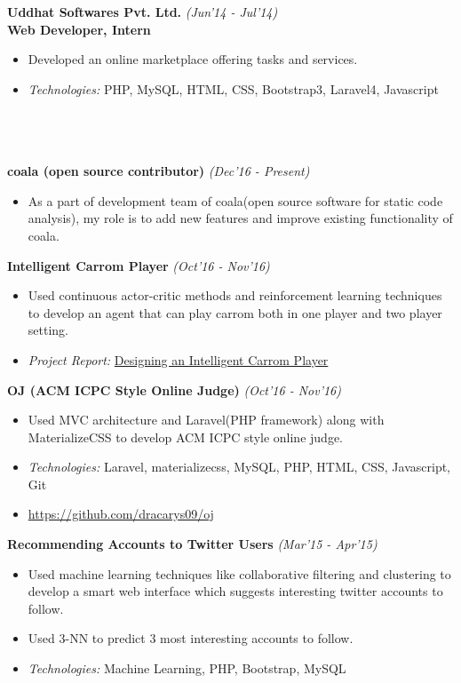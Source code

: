 \documentclass[a4paper,10pt]{article}
\newcommand{\lsep}{-0.5cm}
\newcommand{\resheading}[1]{{\small \colorbox{mygrey}{\begin{minipage}{0.975\textwidth}{\textbf{#1 \vphantom{p\^{E}}}}\end{minipage} \hspace{0.2cm}}}}
\begin{document}
\indent \small{\textbf{Uddhat Softwares Pvt. Ltd.}}	\hfill	\small{\textit{(Jun'14 - Jul'14)}} \\
\indent \small{\textbf{Web Developer, Intern}}
\begin{itemize}
\item \noindent \small{Developed an online marketplace offering tasks and services.}
\\[-0.5cm]
\item \noindent \small{\textit{Technologies:} PHP, MySQL, HTML, CSS, Bootstrap3, Laravel4, Javascript}
\end{itemize}

\indent \resheading{\textbf{PROJECTS}}\\[\lsep]
\\ \\
\indent\small{\textbf{coala (open source contributor)}}	\hfill	\small{\textit{(Dec'16 - Present)}}
\begin{itemize}
 \item As a part of development team of coala(open source software for static code analysis), my role is to add new features and improve existing functionality of coala.
\end{itemize}

\indent\small{\textbf{Intelligent Carrom Player}}	\hfill	\small{\textit{(Oct'16 - Nov'16)}}
\begin{itemize}
 \item Used continuous actor-critic methods and reinforcement learning techniques to develop an agent that can play carrom both in one player and two player setting.
 \item \textit{Project Report: } \href{https://goo.gl/2Csvi8}{Designing an Intelligent Carrom Player}
\end{itemize}

\indent\small{\textbf{OJ (ACM ICPC Style Online Judge)}}	\hfill	\small{\textit{(Oct'16 - Nov'16)}}
\begin{itemize}
 \item Used MVC architecture and Laravel(PHP framework) along with MaterializeCSS to develop ACM ICPC style online judge.
 \item \textit{Technologies: } Laravel, materializecss, MySQL, PHP, HTML, CSS, Javascript, Git
 \item \href{https://github.com/dracarys09/oj}{https://github.com/dracarys09/oj} 
\end{itemize}

\indent\small{\textbf{Recommending Accounts to Twitter Users}}	\hfill	\small{\textit{(Mar'15 - Apr'15)}}
\begin{itemize}
 \item Used machine learning techniques like collaborative filtering and clustering to develop a smart web interface which suggests interesting twitter accounts to follow.
 \item Used 3-NN to predict 3 most interesting accounts to follow.
 \item \textit{Technologies: } Machine Learning, PHP, Bootstrap, MySQL
\end{itemize}
\end{document}

